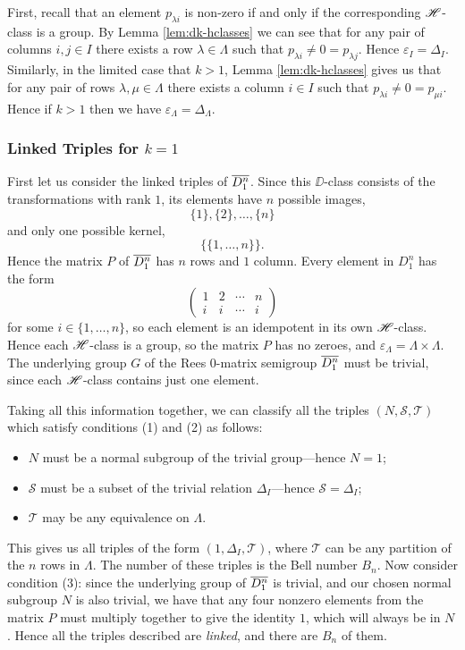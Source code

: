First, recall that an element $p_{\lambda i}$ is non-zero if and only if the
corresponding $\mathrel{\mathscr{H}}$-class is a group.  By Lemma \ref{lem:dk-hclasses} we can see
that for any pair of columns $i,j \in I$ there exists a row
$\lambda \in \Lambda$ such that $p_{\lambda i} \neq 0 = p_{\lambda j}$.  Hence
$\varepsilon_I = \Delta_I$.  Similarly, in the limited case that $k>1$, Lemma
\ref{lem:dk-hclasses} gives us that for any pair of rows
$\lambda, \mu \in \Lambda$ there exists a column $i \in I$ such that
$p_{\lambda i} \neq 0 = p_{\mu i}$.  Hence if $k>1$ then we have
$\varepsilon_\Lambda = \Delta_\Lambda$.

\subsubsection{Linked Triples for $k = 1$}
\label{sec:k1}
First let us consider the linked triples of $\overline{D_1^n}$.  Since this
$\DD$-class consists of the transformations with rank $1$, its elements have $n$
possible images,
$$\{1\}, \{2\}, \dots, \{n\}$$
and only one possible kernel,
$$\big\{\{1, \dots, n\}\big\}.$$
Hence the matrix $P$ of $\overline{D_1^n}$ has $n$ rows and $1$ column.  Every element in
$D_1^n$ has the form
$$\begin{pmatrix}
  1 & 2 & \cdots & n \\
  i & i & \cdots & i
\end{pmatrix}$$ for some $i \in \{1, \dots, n\}$, so each element is an
idempotent in its own $\mathrel{\mathscr{H}}$-class.  Hence each $\mathrel{\mathscr{H}}$-class is a group, so the
matrix $P$ has no zeroes, and $\varepsilon_\Lambda = \Lambda \times \Lambda$.
The underlying group $G$ of the Rees 0-matrix semigroup $\overline{D_1^n}$ must be
trivial, since each $\mathrel{\mathscr{H}}$-class contains just one element.

Taking all this information together, we can classify all the triples $(N,
\mathcal{S}, \mathcal{T})$ which satisfy conditions (1) and (2) as follows:
\begin{itemize}
\item $N$ must be a normal subgroup of the trivial group---hence $N = 1$;
\item $\mathcal{S}$ must be a subset of the trivial relation $\Delta_I$---hence
  $\mathcal{S} = \Delta_I$;
\item $\mathcal{T}$ may be any equivalence on $\Lambda$.
\end{itemize}
This gives us all triples of the form $(1,\Delta_I,\mathcal{T})$, where
$\mathcal{T}$ can be any partition of the $n$ rows in $\Lambda$.  The number of
these triples is the Bell number $B_n$.  Now consider condition (3): since the
underlying group of $\overline{D_1^n}$ is trivial, and our chosen normal subgroup $N$ is
also trivial, we have that any four nonzero elements from the matrix $P$ must
multiply together to give the identity $1$, which will always be in $N$.  Hence all the
triples described are \textit{linked}, and there are $B_n$ of them.

